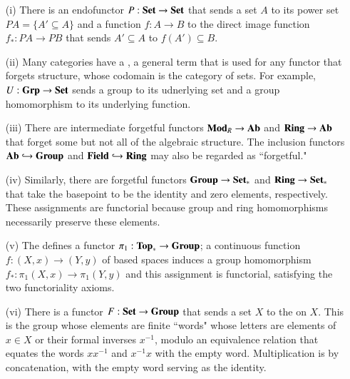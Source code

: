 \documentclass[12pt, a4paper, oneside, openright, titlepage]{book}
\begin{document}
\begin{eg}
    \leavevmode
    \begin{enumerate}
        \item[(i)] There is an endofunctor $P:\normalfont\textbf{Set}\rightarrow \normalfont\textbf{Set}$ that sends a set $A$ to its power set $PA = \{A' \subseteq A\}$ and a function $f:A\rightarrow B$ to the direct image function $f_*:PA\rightarrow PB$ that sends $A' \subseteq A$ to $f(A') \subseteq B$.
        \item[(ii)] Many categories have a , a general term that is used for any functor that forgets structure, whose codomain is the category of sets. For example, $U:\normalfont\textbf{Grp}\rightarrow \normalfont\textbf{Set}$ sends a group to its udnerlying set and a group homomorphism to its underlying function. 
        \item[(iii)] There are intermediate forgetful functors $\normalfont\textbf{Mod}_R\rightarrow \normalfont\textbf{Ab}$ and $\normalfont\textbf{Ring}\rightarrow \normalfont\textbf{Ab}$ that forget some but not all of the algebraic structure. The inclusion functors $\normalfont\textbf{Ab}\hookrightarrow \normalfont\textbf{Group}$ and $\normalfont\textbf{Field}\hookrightarrow \normalfont\textbf{Ring}$ may also be regarded as ``forgetful."
        \item[(iv)] Similarly, there are forgetful functors $\normalfont\textbf{Group}\rightarrow \normalfont\textbf{Set}_*$ and $\normalfont\textbf{Ring}\rightarrow \normalfont\textbf{Set}_*$ that take the basepoint to be the identity and zero elements, respectively. These assignments are functorial because group and ring homomorphisms necessarily preserve these elements.
        \item[(v)] The  defines a functor $\pi_1:\normalfont\textbf{Top}_*\rightarrow \normalfont\textbf{Group}$; a continuous function $f:(X,x)\rightarrow (Y,y)$ of based spaces induces a group homomorphism $f_*:\pi_1(X,x)\rightarrow \pi_1(Y,y)$ and this assignment is functorial, satisfying the two functoriality axioms. 
        \item[(vi)] There is a functor $F:\normalfont\textbf{Set}\rightarrow \normalfont\textbf{Group}$ that sends a set $X$ to the  on $X$. This is the group whose elements are finite ``words" whose letters are elements of $x \in X$ or their formal inverses $x^{-1}$, modulo an equivalence relation that equates the words $xx^{-1}$ and $x^{-1}x$ with the empty word. Multiplication is by concatenation, with the empty word serving as the identity.

\end{enumerate}
\end{eg}
\end{document}
